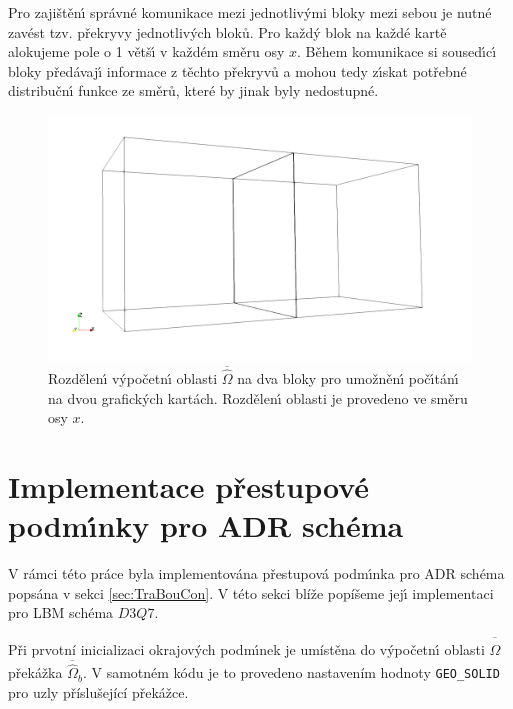             Pro zaji\v{s}t\v{e}n\'{\i} spr\'{a}vn\'{e} komunikace mezi jednotliv\'{y}mi bloky mezi sebou je nutn\'{e} zav\'{e}st tzv. p\v{r}ekryvy jednotliv\'{y}ch blok\r{u}. Pro ka\v{z}d\'{y} blok na ka\v{z}d\'{e} kart\v{e} alokujeme pole o 1 v\v{e}t\v{s}\'{\i} v ka\v{z}d\'{e}m sm\v{e}ru osy $x$. B\v{e}hem komunikace si soused\'{\i}c\'{\i} bloky p\v{r}ed\'{a}vaj\'{\i} informace z t\v{e}chto p\v{r}ekryv\r{u} a mohou tedy z\'{\i}skat pot\v{r}ebn\'{e} distribu\v{c}n\'{\i} funkce ze sm\v{e}r\r{u}, kter\'{e} by jinak byly nedostupn\'{e}.

            \begin{figure}[H]
                \centering
                \includegraphics[width=.7\linewidth]{Img/Kapitola 2/More_GPUs_domain.png}
                \caption{Rozd\v{e}len\'{\i} v\'{y}po\v{c}etn\'{\i} oblasti $\overline{\hat{\Omega}}$ na dva bloky pro umo\v{z}n\v{e}n\'{\i} po\v{c}\'{\i}t\'{a}n\'{\i} na dvou grafick\'{y}ch kart\'{a}ch. Rozd\v{e}len\'{\i} oblasti je provedeno ve sm\v{e}ru osy $x$.}
                \label{fig:blocks}
            \end{figure}    

    \section{Implementace p\v{r}estupov\'{e} podm\'{\i}nky pro ADR sch\'{e}ma}

        V r\'{a}mci t\'{e}to pr\'{a}ce byla implementov\'{a}na p\v{r}estupov\'{a} podm\'{\i}nka pro ADR sch\'{e}ma pops\'{a}na v sekci \ref{sec:TraBouCon}. V t\'{e}to sekci bl\'{i}\v{z}e pop\'{i}\v{s}eme jej\'{\i} implementaci pro LBM sch\'{e}ma $D3Q7$. 

        P\v{r}i prvotn\'{i} inicializaci okrajov\'{y}ch podm\'{\i}nek je um\'{i}st\v{e}na do v\'{y}po\v{c}etn\'{\i} oblasti $\overline{\hat{\Omega}}$ p\v{r}ek\'{a}\v{z}ka $\overline{\hat{\Omega}}_{b}$. V samotn\'{e}m k\'{o}du je to provedeno nastaven\'{i}m hodnoty \texttt{\lstinline{GEO_SOLID}} pro uzly p\v{r}\'{i}slu\v{s}ej\'{i}c\'{i} p\v{r}ek\'{a}\v{z}ce.

